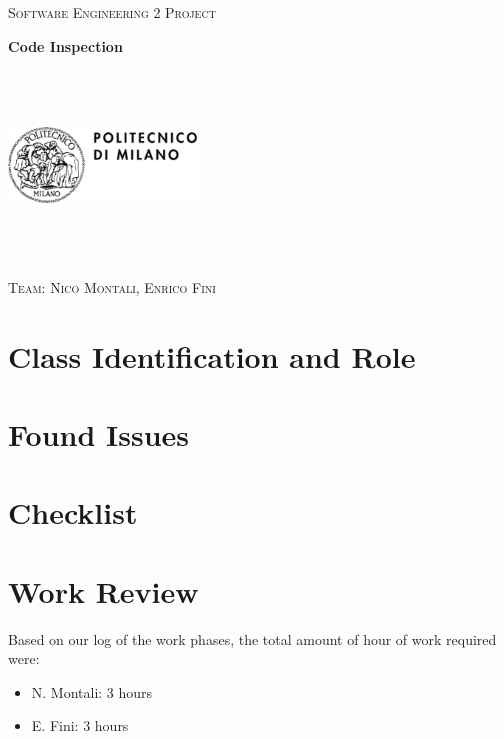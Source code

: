 \documentclass[a4paper,12pt,oneside]{book}
\begin{document}
	
	\pagestyle{empty}\centering
	\textsc{\Large Software Engineering 2 Project\\}

	\vfill

	\textbf{\Huge Code Inspection}
	
	\vfill
	\begin{center}	
	\includegraphics[width=5cm,height=5cm,keepaspectratio]{polimi}
	\end{center}
	\textsc{\Large Team: Nico Montali, Enrico Fini}
	
	{\hypersetup{linkcolor=black}
		\tableofcontents
	}
	
	\clearpage
	

	\begin{flushleft}
	\chapter{Class Identification and Role}\label{cap:Class}
	
	\chapter{Found Issues}\label{cap:issue}
	
	\chapter{Checklist}\label{cap:checklist}
	
	
	\chapter{Work Review}
	Based on our log of the work phases, the total amount of hour of work required were:
	\begin{itemize}
	\item N. Montali: 3 hours
	\item E. Fini: 3 hours
	\end{itemize}

	
	
	\end{flushleft}
\end{document}
